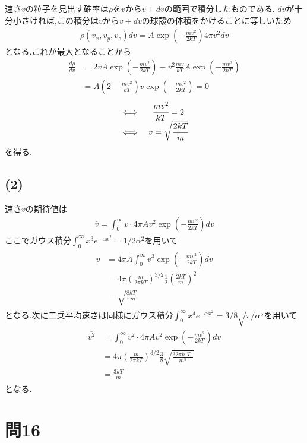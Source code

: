 \documentclass[uplatex,a4j,11pt,dvipdfmx]{jsarticle}
\begin{document}
速さ$v$の粒子を見出す確率は$\rho$を$v$から$v+dv$の範囲で積分したものである.
$dv$が十分小さければ,この積分は$v$から$v+dv$の球殻の体積をかけることに等しいため
\begin{align}
  \rho(v_x,v_y,v_z)dv=A\exp\left(-\frac{mv^2}{2kT}\right)4\pi v^2dv
\end{align}
となる.これが最大となることから
\begin{align*}
    \frac{d\rho}{dv}&=2vA\exp\left(-\frac{mv^2}{2kT}\right)-v^2\frac{mv}{kT}A\exp\left(-\frac{mv^2}{2kT}\right)\\
    &=A\left(2-\frac{mv^2}{kT}\right)v\exp\left(-\frac{mv^2}{2kT}\right)=0
\end{align*}
\begin{align}
  \begin{split}
    \begin{array}{cc}
      \iff&\cfrac{mv^2}{kT}=2\\
      \iff&v=\sqrt{\cfrac{2kT}{m}}
    \end{array}
  \end{split}
\end{align}
を得る.
\subsection*{(2)}
速さ$v$の期待値は
\begin{align}
  \overline{v}=\int_0^\infty v\cdot 4\pi Av^2\exp\left(-\frac{mv^2}{2kT}\right)dv
\end{align}
ここでガウス積分$\int_0^\infty x^3e^{-\alpha x^2}=1/2\alpha^2$を用いて
\begin{align}
  \begin{split}
    \overline{v}&=4\pi A\int_0^\infty v^3\exp\left(-\frac{mv^2}{2kT}\right)dv\\
    &=4\pi\left(\frac{m}{2\pi kT}\right)^{3/2}\frac{1}{2}\left(\frac{2kT}{m}\right)^2\\
    &=\sqrt{\frac{8kT}{\pi m}}
  \end{split}
\end{align}
となる.次に二乗平均速さは同様にガウス積分$\int_0^\infty x^4e^{-\alpha x^2}=3/8\sqrt{\pi/\alpha^5}$を用いて
\begin{align}
  \begin{split}
    \overline{v^2}&=\int_0^\infty v^2\cdot4\pi Av^2\exp\left(-\frac{mv^2}{2kT}\right)dv\\
    &=4\pi\left(\frac{m}{2\pi kT}\right)^{3/2}\frac{3}{8}\sqrt{\frac{32\pi k^5T^5}{m^5}}\\
    &=\frac{3kT}{m}
  \end{split}
\end{align}
となる.
\section*{問16}
\setcounter{section}{16}
\setcounter{equation}{0}

\end{document}
